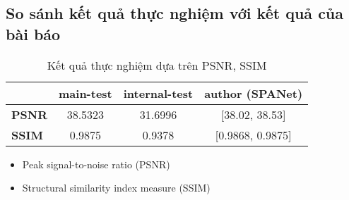 \subsection{So sánh kết quả thực nghiệm với kết quả của bài báo}
\hspace{10mm}{Chỉ tiêu so sánh cũng căn cứ vào hai độ đo rất thông dụng trong các bài toán nâng cao chất lượng ảnh được trình bày ở mục 3.2.}

\begin{table}[h!]
\centering
\begin{tabular}{|l|c|c|c|}
\hline
 & \multicolumn{1}{l|}{\textbf{main-test}} & \multicolumn{1}{l|}{\textbf{internal-test}} & \multicolumn{1}{l|}{\textbf{author (SPANet)}} \\ \hline
\textbf{PSNR} & 38.5323 & 31.6996 & {[}38.02, 38.53{]} \\ \hline
\textbf{SSIM} & 0.9875 & 0.9378 & {[}0.9868, 0.9875{]} \\ \hline
\end{tabular}
\caption[Bảng so sánh kết quả thực nghiệm]{Kết quả thực nghiệm dựa trên PSNR, SSIM \cite{hore2010image}}
\label{tab:so-sanh-ket-qua}
\end{table}

\begin{itemize}
    \item Peak signal-to-noise ratio (PSNR)
    \item Structural similarity index measure (SSIM)
\end{itemize}




